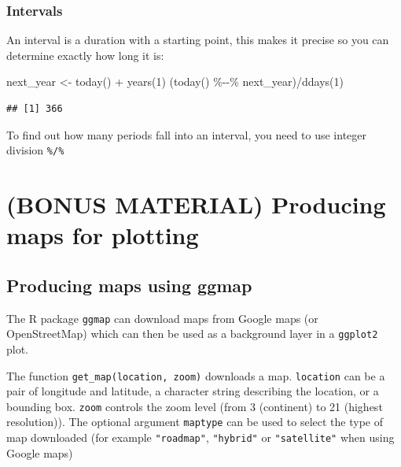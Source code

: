 \documentclass[
]{book}
\newenvironment{Shaded}{\begin{snugshade}}{\end{snugshade}}
\newcommand{\DecValTok}[1]{\textcolor[rgb]{0.00,0.00,0.81}{#1}}
\newcommand{\FunctionTok}[1]{\textcolor[rgb]{0.00,0.00,0.00}{#1}}
\newcommand{\NormalTok}[1]{#1}
\newcommand{\OtherTok}[1]{\textcolor[rgb]{0.56,0.35,0.01}{#1}}
\newcommand{\SpecialCharTok}[1]{\textcolor[rgb]{0.00,0.00,0.00}{#1}}
\begin{document}
\hypertarget{intervals}{%
\subsection{Intervals}\label{intervals}}

An interval is a duration with a starting point, this makes it precise so you can determine exactly how long it is:

\begin{Shaded}
\begin{Highlighting}[]
\NormalTok{next\_year }\OtherTok{\textless{}{-}} \FunctionTok{today}\NormalTok{() }\SpecialCharTok{+} \FunctionTok{years}\NormalTok{(}\DecValTok{1}\NormalTok{)}
\NormalTok{(}\FunctionTok{today}\NormalTok{() }\SpecialCharTok{\%{-}{-}\%}\NormalTok{ next\_year)}\SpecialCharTok{/}\FunctionTok{ddays}\NormalTok{(}\DecValTok{1}\NormalTok{)}
\end{Highlighting}
\end{Shaded}

\begin{verbatim}
## [1] 366
\end{verbatim}

To find out how many periods fall into an interval, you need to use integer division \texttt{\%/\%}

\hypertarget{bonus-material-producing-maps-for-plotting}{%
\chapter{(BONUS MATERIAL) Producing maps for plotting}\label{bonus-material-producing-maps-for-plotting}}

\hypertarget{producing-maps-using-ggmap}{%
\section{Producing maps using ggmap}\label{producing-maps-using-ggmap}}

The R package \texttt{ggmap} can download maps from Google maps (or OpenStreetMap) which can then be used as a background layer in a \texttt{ggplot2} plot.

The function \texttt{get\_map(location,\ zoom)} downloads a map. \texttt{location} can be a pair of longitude and latitude, a character string describing the location, or a bounding box. \texttt{zoom} controls the zoom level (from 3 (continent) to 21 (highest resolution)). The optional argument \texttt{maptype} can be used to select the type of map downloaded (for example \texttt{"roadmap"}, \texttt{"hybrid"} or \texttt{"satellite"} when using Google maps)
\end{document}
